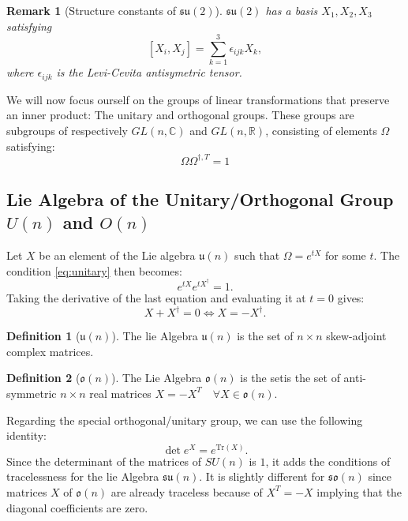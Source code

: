 \documentclass[11pt,a4paper]{article}
\newtheorem*{remark}{Remark}
\theoremstyle{definition}
\newtheorem{definition}{Definition}[section]
\numberwithin{equation}{section}
\begin{document}
\begin{remark}[Structure constants of $\mathfrak{su}(2)$]
    $\mathfrak{su}(2)$ has a basis $X_1,X_2,X_3$ satisfying
    \begin{equation*}
        \left[X_i,X_j\right] = \sum_{k=1}^{3}\epsilon_{ijk}X_k,
    \end{equation*}
    where $\epsilon_{ijk}$ is the Levi-Cevita antisymetric tensor.
\end{remark}
We will now focus ourself on the groups of linear transformations that preserve an inner product: The unitary and orthogonal groups. These groups are subgroups of respectively $GL(n,\mathbb{C})$ and $GL(n,\mathbb{R})$, consisting of elements $\Omega$ satisfying:
\begin{equation}
    \label{eq:unitary}
    \Omega\Omega^{\dagger,T} = 1
\end{equation}
\subsection{Lie Algebra of the Unitary/Orthogonal Group $U(n)$ and $ O(n)$}
Let $X$ be an element of the Lie algebra $\mathfrak{u}(n)$ such that $\Omega = e^{tX}$ for some $t$.
The condition \ref{eq:unitary} then becomes:
\begin{equation*}
    e^{tX}e^{tX^\dagger} = 1.
\end{equation*}
Taking the derivative of the last equation and evaluating it at $t=0$ gives:
\begin{equation*}
    X + X^\dagger = 0 \Leftrightarrow X = -X^\dagger.
\end{equation*}
\begin{definition}[$\mathfrak{u}(n)$]
    The lie Algebra $\mathfrak{u}(n)$ is the set of $n\times n$ skew-adjoint complex matrices.
\end{definition}

\begin{definition}[$\mathfrak{o}(n)$]
    The Lie Algebra $\mathfrak{o}(n)$ is the setis the set of  anti-symmetric $n\times n$ real matrices $X = - X^T \quad \forall X \in \mathfrak{o}(n)$.
\end{definition}
Regarding the special orthogonal/unitary group, we can use the following identity:
\begin{equation*}
    \det e^{X} = e^{\text{Tr}(X)}.
\end{equation*}
Since the determinant of the matrices of $SU(n)$ is $1$, it adds the conditions of tracelessness for the lie Algebra  $\mathfrak{su}(n)$. It is slightly different for $\mathfrak{so}(n)$ since matrices $X$ of $\mathfrak{o}(n)$ are already traceless because of $X^T = -X$ implying that the diagonal coefficients are zero.
\end{document}
